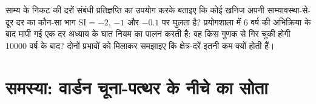 \begin{exercise}[$\star\star\star$]\label{exo:b3:water-rock-interaction:12}
साम्य के निकट की दरों संबंधी प्रतिज्ञप्ति का उपयोग करके बताइए कि कोई खनिज अपनी
साम्यावस्था-से-दूर दर का कौन-सा भाग $\mathrm{SI} =
-2$, $-1$ और $-0.1$ पर घुलता है? प्रयोगशाला में 6 वर्ष की अभिक्रिया के बाद मापी गई एक दर
अध्याय के घात नियम का पालन करती है: वह किस गुणक से गिर चुकी होगी
\num{10000} वर्ष के बाद? दोनों प्रभावों को मिलाकर समझाइए कि क्षेत्र-दरें
इतनी कम क्यों होती हैं।
\end{exercise}

\section{समस्या: वार्डन चूना-पत्थर के नीचे का सोता}

